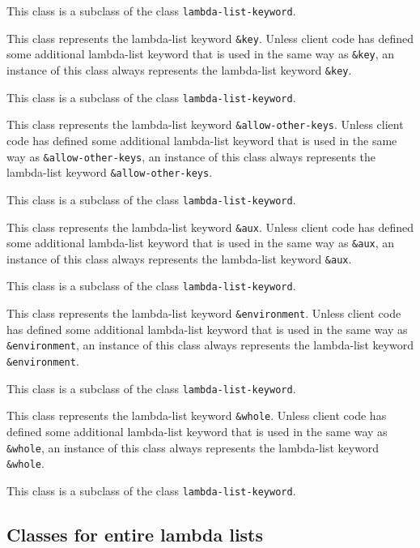 This class is a subclass of the class \texttt{lambda-list-keyword}.


This class represents the lambda-list keyword \texttt{\&key}.
Unless client code has defined some additional lambda-list keyword
that is used in the same way as \texttt{\&key}, an instance of
this class always represents the lambda-list keyword
\texttt{\&key}.

This class is a subclass of the class \texttt{lambda-list-keyword}.


This class represents the lambda-list keyword \texttt{\&allow-other-keys}.
Unless client code has defined some additional lambda-list keyword
that is used in the same way as \texttt{\&allow-other-keys}, an instance of
this class always represents the lambda-list keyword
\texttt{\&allow-other-keys}.

This class is a subclass of the class \texttt{lambda-list-keyword}.


This class represents the lambda-list keyword \texttt{\&aux}.
Unless client code has defined some additional lambda-list keyword
that is used in the same way as \texttt{\&aux}, an instance of
this class always represents the lambda-list keyword
\texttt{\&aux}.

This class is a subclass of the class \texttt{lambda-list-keyword}.


This class represents the lambda-list keyword \texttt{\&environment}.
Unless client code has defined some additional lambda-list keyword
that is used in the same way as \texttt{\&environment}, an instance of
this class always represents the lambda-list keyword
\texttt{\&environment}.

This class is a subclass of the class \texttt{lambda-list-keyword}.


This class represents the lambda-list keyword \texttt{\&whole}.
Unless client code has defined some additional lambda-list keyword
that is used in the same way as \texttt{\&whole}, an instance of
this class always represents the lambda-list keyword
\texttt{\&whole}.

This class is a subclass of the class \texttt{lambda-list-keyword}.

\subsection{Classes for entire lambda lists}

